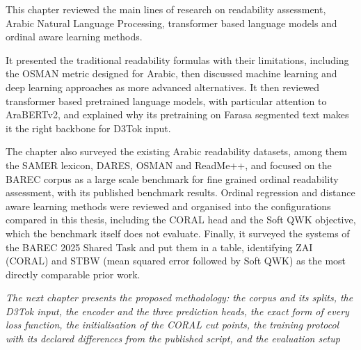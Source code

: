 \documentclass[12pt]{report}
\begin{document}
This chapter reviewed the main lines of research on readability assessment, Arabic Natural Language Processing, transformer based language models and ordinal aware learning methods.

It presented the traditional readability formulas with their limitations, including the OSMAN metric designed for Arabic, then discussed machine learning and deep learning approaches as more advanced alternatives. It then reviewed transformer based pretrained language models, with particular attention to AraBERTv2, and explained why its pretraining on Farasa segmented text makes it the right backbone for D3Tok input.

The chapter also surveyed the existing Arabic readability datasets, among them the SAMER lexicon, DARES, OSMAN and ReadMe++, and focused on the BAREC corpus as a large scale benchmark for fine grained ordinal readability assessment, with its published benchmark results. Ordinal regression and distance aware learning methods were reviewed and organised into the configurations compared in this thesis, including the CORAL head and the Soft QWK objective, which the benchmark itself does not evaluate. Finally, it surveyed the systems of the BAREC 2025 Shared Task and put them in a table, identifying ZAI (CORAL) and STBW (mean squared error followed by Soft QWK) as the most directly comparable prior work.

\textit{The next chapter presents the proposed methodology: the corpus and its splits, the D3Tok input, the encoder and the three prediction heads, the exact form of every loss function, the initialisation of the CORAL cut points, the training protocol with its declared differences from the published script, and the evaluation setup}





\end{document}
